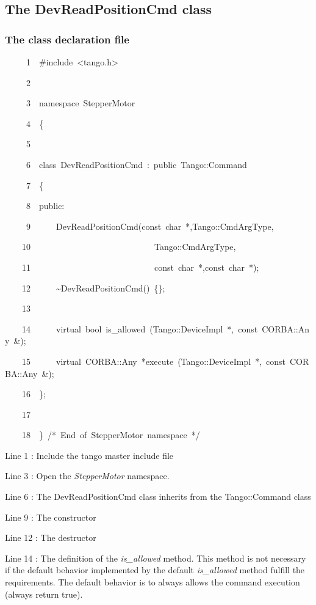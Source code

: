 \subsection{The DevReadPositionCmd class}

\subsubsection{The class declaration file}


\begin{lyxcode}
~~~~~1~~\#include~<tango.h>

~~~~~2~~

~~~~~3~~namespace~StepperMotor

~~~~~4~~\{

~~~~~5~~

~~~~~6~~class~DevReadPositionCmd~:~public~Tango::Command

~~~~~7~~\{

~~~~~8~~public:

~~~~~9~~~~~~DevReadPositionCmd(const~char~{*},Tango::CmdArgType,

~~~~10~~~~~~~~~~~~~~~~~~~~~~~~~~~~~Tango::CmdArgType,

~~~~11~~~~~~~~~~~~~~~~~~~~~~~~~~~~~const~char~{*},const~char~{*});

~~~~12~~~~~~\textasciitilde{}DevReadPositionCmd()~\{\};

~~~~13~~~~~~~~~~

~~~~14~~~~~~virtual~bool~is\_allowed~(Tango::DeviceImpl~{*},~const~CORBA::Any~\&);

~~~~15~~~~~~virtual~CORBA::Any~{*}execute~(Tango::DeviceImpl~{*},~const~CORBA::Any~\&);

~~~~16~~\};

~~~~17~~

~~~~18~~\}~/{*}~End~of~StepperMotor~namespace~{*}/
\end{lyxcode}


Line 1 : Include the tango master include file

Line 3 : Open the \emph{StepperMotor} namespace.

Line 6 : The DevReadPositionCmd class inherits from the Tango::Command
class

Line 9 : The constructor

Line 12 : The destructor

Line 14 : The definition of the \emph{is\_allowed}
method. This method is not necessary if the default behavior implemented
by the default \emph{is\_allowed} method fulfill the requirements.
The default behavior is to always allows the command execution (always
return true).


